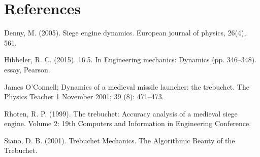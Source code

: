 \documentclass[12pt, titlepage]{article}
\begin{document}
    \section{References}
        \hspace{15pt}Denny, M. (2005). Siege engine dynamics. European journal of physics, 26(4), 561.

        Hibbeler, R. C. (2015). 16.5. In Engineering mechanics: Dynamics (pp. 346–348). essay, Pearson.
        
        James O'Connell; Dynamics of a medieval missile launcher: the trebuchet. The Physics Teacher 1 November 2001; 39 (8): 471–473.

        Rhoten, R. P. (1999). The trebuchet: Accuracy analysis of a medieval siege engine. Volume 2: 19th Computers and Information in Engineering Conference.

        Siano, D. B. (2001). Trebuchet Mechanics. The Algorithmic Beauty of the Trebuchet.
\end{document}
